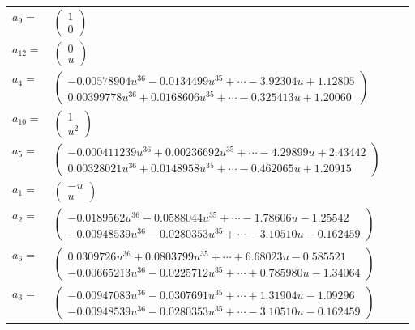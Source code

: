 \documentclass[1p]{elsarticle_modified}
\theoremstyle{definition}
\begin{document}
\begin{tabular}{m{7pt} m{180pt} m{7pt} m{180pt} }
\flushright $a_{9}=$&$\begin{pmatrix}1\\0\end{pmatrix}$ \\
\flushright $a_{12}=$&$\begin{pmatrix}0\\u\end{pmatrix}$ \\
\flushright $a_{4}=$&$\begin{pmatrix}-0.00578904 u^{36}-0.0134499 u^{35}+\cdots-3.92304 u+1.12805\\0.00399778 u^{36}+0.0168606 u^{35}+\cdots-0.325413 u+1.20060\end{pmatrix}$ \\
\flushright $a_{10}=$&$\begin{pmatrix}1\\u^2\end{pmatrix}$ \\
\flushright $a_{5}=$&$\begin{pmatrix}-0.000411239 u^{36}+0.00236692 u^{35}+\cdots-4.29899 u+2.43442\\0.00328021 u^{36}+0.0148958 u^{35}+\cdots-0.462065 u+1.20915\end{pmatrix}$ \\
\flushright $a_{1}=$&$\begin{pmatrix}- u\\u\end{pmatrix}$ \\
\flushright $a_{2}=$&$\begin{pmatrix}-0.0189562 u^{36}-0.0588044 u^{35}+\cdots-1.78606 u-1.25542\\-0.00948539 u^{36}-0.0280353 u^{35}+\cdots-3.10510 u-0.162459\end{pmatrix}$ \\
\flushright $a_{6}=$&$\begin{pmatrix}0.0309726 u^{36}+0.0803799 u^{35}+\cdots+6.68023 u-0.585521\\-0.00665213 u^{36}-0.0225712 u^{35}+\cdots+0.785980 u-1.34064\end{pmatrix}$ \\
\flushright $a_{3}=$&$\begin{pmatrix}-0.00947083 u^{36}-0.0307691 u^{35}+\cdots+1.31904 u-1.09296\\-0.00948539 u^{36}-0.0280353 u^{35}+\cdots-3.10510 u-0.162459\end{pmatrix}$ \\

\end{tabular}
\end{document}
